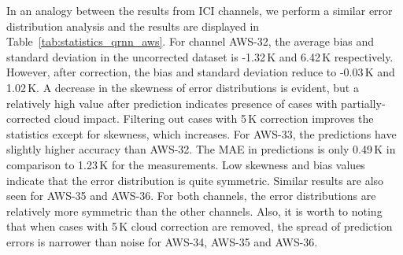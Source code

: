 \documentclass[amt, manuscript]{copernicus}
\begin{document}
In an analogy between the results from ICI channels, we perform a similar error distribution analysis  and the results are displayed in Table~\ref{tab:statistics_qrnn_aws}. For channel AWS-32, the average bias and standard deviation in the uncorrected dataset is -1.32\,K and 6.42\,K respectively. However, after correction, the bias and standard deviation reduce to -0.03\,K and 1.02\,K. A decrease in the skewness of error distributions is evident, but a relatively high value after prediction indicates presence of cases with partially-corrected cloud impact. Filtering out cases with 5\,K correction improves the statistics except for skewness, which increases. For AWS-33, the predictions have slightly higher accuracy than AWS-32. The MAE in predictions is only 0.49\,K in comparison to 1.23\,K for the measurements. Low skewness and bias values indicate that the error distribution is quite symmetric. Similar results are also seen for AWS-35 and AWS-36. For both channels, the error distributions are relatively more symmetric than the other channels. Also, it is worth to noting that when cases with 5\,K cloud correction are removed, the spread of prediction errors is narrower than noise for AWS-34, AWS-35 and AWS-36. 
\end{document}
